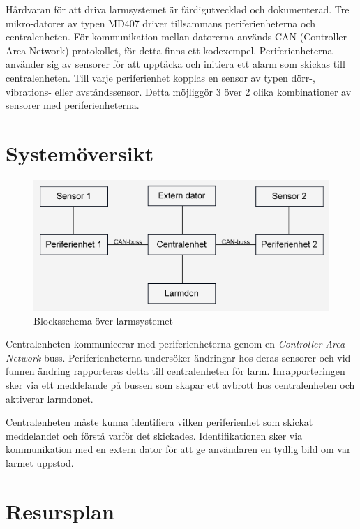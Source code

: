 \documentclass[a4paper]{article}
\begin{document}
Hårdvaran för att driva larmsystemet är färdigutvecklad och dokumenterad. Tre mikro-datorer av typen MD407 driver tillsammans periferienheterna och centralenheten. För kommunikation mellan datorerna används CAN (Controller Area Network)-protokollet, för detta finns ett kodexempel. Periferienheterna använder sig av sensorer för att upptäcka och initiera ett alarm som skickas till centralenheten. Till varje periferienhet kopplas en sensor av typen dörr-, vibrations- eller avståndssensor. Detta möjliggör 3 över 2 olika kombinationer av sensorer med periferienheterna.


\section{Systemöversikt}

\begin{figure}[H]
    \centering
    \includegraphics[width=\textwidth]{blockschema.png}
    \caption{Blocksschema över larmsystemet}
\end{figure}

Centralenheten kommunicerar med periferienheterna genom en \textit{Controller Area Network}-buss. Periferienheterna undersöker ändringar hos deras sensorer och vid funnen ändring rapporteras detta till centralenheten för larm. Inrapporteringen sker via ett meddelande på bussen som skapar ett avbrott hos centralenheten och aktiverar larmdonet.

Centralenheten måste kunna identifiera vilken periferienhet som skickat meddelandet och förstå varför det skickades. Identifikationen sker via kommunikation med en extern dator för att ge användaren en tydlig bild om var larmet uppstod.

\section{Resursplan}
\end{document}
